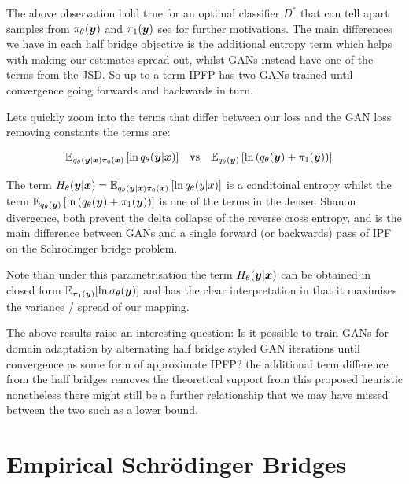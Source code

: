 \documentclass[a4paper,12pt,twoside,openright]{report}
\theoremstyle{definition}
\begin{document}
The above observation hold true for an optimal classifier $D^{*}$ that can tell apart samples from $\pi_\theta({\bm{y}})$ and $\pi_1({\bm{y}})$ see \cite{mohamed2016learning} for further motivations. The main differences we have in each half bridge objective is the additional entropy term which helps with making our estimates spread out, whilst GANs instead have one of the terms from the JSD.  So up to a term IPFP has two GANs trained until convergence going forwards and backwards in turn.

Lets quickly zoom into the terms that differ between our loss and the GAN loss removing constants the terms are:

\begin{align}
 \mathbb{E}_{q_{\theta}({\bm{y}}|{\bm{x}})\pi_0({\bm{x}})}\left[ \operatorname{ln} q_{\theta}({\bm{y}}|{\bm{x}}) \right]\quad &\text{vs} \quad  \mathbb{E}_{q_{\theta}({\bm{y}})}\left[\operatorname{ln}\left(q_{\theta}({\bm{y}}) + \pi_1({\bm{y}})\right)\right]
\end{align}

The term $H_{\theta}({\bm{y}}|{\bm{x}}) =\mathbb{E}_{q_{\theta}({\bm{y}}|{\bm{x}})\pi_0({\bm{x}})}\left[ \operatorname{ln} q_{\theta}(y|x) \right]$ is a conditoinal entropy whilst the term $\mathbb{E}_{q_{\theta}({\bm{y}})}\left[\operatorname{ln}\left(q_{\theta}({\bm{y}}) + \pi_1({\bm{y}})\right)\right]$ is one of the terms in the Jensen Shanon divergence, both prevent the delta collapse of the reverse cross entropy, and is the main difference between GANs and a single forward (or backwards) pass of IPF on the Schrödinger bridge problem.

 Note than under this parametrisation the term $H_{\theta}({\bm{y}}|{\bm{x}})$ can be obtained in closed form $\mathbb{E}_{\pi_1({\bm{y}})}[\operatorname{ln} {\sigma}_{\theta}({\bm{y}})]$ and has the clear interpretation in that it maximises the variance / spread of our mapping.
 
 The above results raise an interesting question: Is it possible to train GANs for domain adaptation by alternating  half bridge styled GAN iterations until convergence as some form of approximate IPFP? the additional term difference from the half bridges removes the theoretical support from this proposed heuristic nonetheless there might still be a further relationship that we may have missed between the two such as a lower bound.



\chapter{Empirical Schrödinger Bridges}
\end{document}
